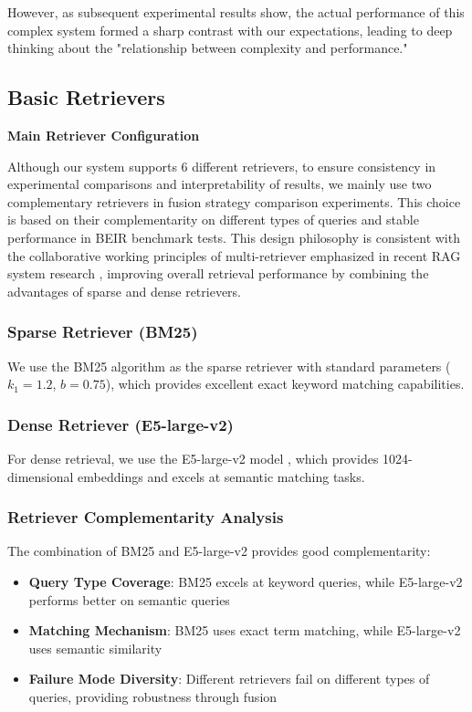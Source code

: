 \documentclass[letterpaper]{article} %
\begin{document}
However, as subsequent experimental results show, the actual performance of this complex system formed a sharp contrast with our expectations, leading to deep thinking about the "relationship between complexity and performance."

\subsection{Basic Retrievers}

\textbf{Main Retriever Configuration}

Although our system supports 6 different retrievers, to ensure consistency in experimental comparisons and interpretability of results, we mainly use two complementary retrievers in fusion strategy comparison experiments. This choice is based on their complementarity on different types of queries and stable performance in BEIR benchmark tests. This design philosophy is consistent with the collaborative working principles of multi-retriever emphasized in recent RAG system research \cite{gao2024retrieval}, improving overall retrieval performance by combining the advantages of sparse and dense retrievers.

\subsubsection{Sparse Retriever (BM25)}

We use the BM25 algorithm as the sparse retriever with standard parameters ($k_1 = 1.2$, $b = 0.75$), which provides excellent exact keyword matching capabilities.

\subsubsection{Dense Retriever (E5-large-v2)}

For dense retrieval, we use the E5-large-v2 model \cite{wang2022text}, which provides 1024-dimensional embeddings and excels at semantic matching tasks.

\subsubsection{Retriever Complementarity Analysis}

The combination of BM25 and E5-large-v2 provides good complementarity:

\begin{itemize}
\item \textbf{Query Type Coverage}: BM25 excels at keyword queries, while E5-large-v2 performs better on semantic queries
\item \textbf{Matching Mechanism}: BM25 uses exact term matching, while E5-large-v2 uses semantic similarity
\item \textbf{Failure Mode Diversity}: Different retrievers fail on different types of queries, providing robustness through fusion
\end{itemize}
\end{document}
